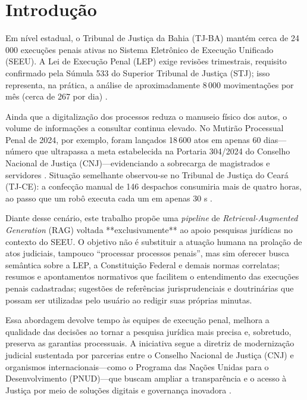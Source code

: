 
\chapter{Introdução}
\label{sec:introducao}

Em nível estadual, o Tribunal de Justiça da Bahia (TJ-BA) mantém cerca de
24\,000 execuções penais ativas no Sistema Eletrônico de Execução Unificado
(SEEU). A Lei de Execução Penal (LEP) exige revisões trimestrais, requisito
confirmado pela Súmula 533 do Superior Tribunal de Justiça (STJ); isso
representa, na prática, a análise de aproximadamente 8\,000 movimentações por
mês (cerca de 267 por dia) \cite{brasil1984lep,stj2015sumula533}. 

Ainda que a digitalização dos processos reduza o manuseio físico dos autos, o
volume de informações a consultar continua elevado. No Mutirão Processual Penal
de 2024, por exemplo, foram lançados 18\,600 atos em apenas 60 dias—número que
ultrapassa a meta estabelecida na Portaria 304/2024 do Conselho Nacional de
Justiça (CNJ)—evidenciando a sobrecarga de magistrados e servidores
\cite{tjba2024mutirao,cnj2024portaria304}. Situação semelhante observou-se no
Tribunal de Justiça do Ceará (TJ-CE): a confecção manual de 146 despachos
consumiria mais de quatro horas, ao passo que um robô executa cada um em apenas
30 s \cite{tjce2023robos}. 

Diante desse cenário, este trabalho propõe uma \emph{pipeline} de
\emph{Retrieval-Augmented Generation} (RAG) voltada **exclusivamente** ao apoio
pesquisas jurídicas no contexto do SEEU. O objetivo não é substituir a atuação
humana na prolação de atos judiciais, tampouco “processar processos penais”, mas
sim oferecer busca semântica sobre a LEP, a Constituição Federal e demais normas
correlatas; resumos e apontamentos normativos que facilitem o entendimento das execuções penais cadastradas; sugestões de referências
jurisprudenciais e doutrinárias que possam ser utilizadas pelo usuário ao redigir suas próprias minutas.

Essa abordagem devolve tempo às equipes de execução penal, melhora a qualidade
das decisões ao tornar a pesquisa jurídica mais precisa e, sobretudo, preserva
as garantias processuais. A iniciativa segue a diretriz de modernização
judicial sustentada por parcerias entre o Conselho Nacional de Justiça (CNJ) e
organismos internacionais—como o Programa das Nações Unidas para o
Desenvolvimento (PNUD)—que buscam ampliar a transparência e o acesso à Justiça
por meio de soluções digitais e governança inovadora
\cite{undp2025pnudcnj}.


